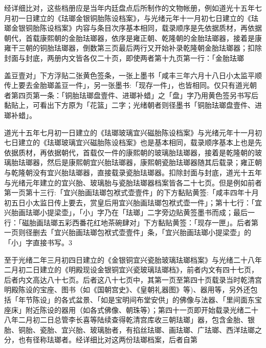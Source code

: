 经详细比对，这些档册应是当年内廷盘点后所制作的文物帐册，例如道光十五年七月初一日建立的《珐瑯金银铜胎陈设档案》，与光绪元年十一月初七日建立的《珐瑯金银铜胎陈设档案》内容与条目次序基本相同，载录顺序是先依据质材，再依据朝代，首载康熙朝的金胎珐瑯器，依序是雍正朝、乾隆朝的金胎珐瑯器，接着是康雍干三朝的铜胎珐瑯器，倒数第三页最后两行又开始补录乾隆朝金胎珐瑯器；扣除封面与封底，两册内文皆各仅二十页，即使两者第十九页第一行：「金胎珐瑯

\vfill
\begin{BookNotes}
\end{BookNotes}

\noindent 盖豆壹对」下方浮贴二张黄色签条，一张上墨书「咸丰三年六月十八日小太监平顺传上要去金胎瑯盖豆一件」，另一张墨书:「现存一件」，也皆相同。仅只有道光朝者第四页第一条：「铜胎珐瑯盘壹件、进瑯补蜡」之「盘」字乃用黄色签另书写后黏贴上，可看出下方原为「花篮」二字；光绪朝者则径墨书「铜胎珐瑯盘壹件、进瑯补蜡」。

道光十五年七月初一日建立的《珐瑯玻璃宜兴磁胎陈设档案》与光绪元年十一月初七日建立的《珐瑯玻璃宜兴磁胎陈设档案》也是基本相同，载录顺序基本上也是先依据质材，再依据朝代，首载仅一件的康熙朝的玻璃胎珐瑯器，接着是乾隆朝的玻璃胎珐瑯器，然后是康熙朝宜兴胎珐瑯器，康熙朝瓷胎珐瑯器随其后载录；雍正朝与乾隆朝没有宜兴胎珐瑯器，直接载录瓷胎珐瑯器。扣除封面与封底，道光十五年与光绪元年建立的宜兴胎、玻璃胎与瓷胎珐瑯器档案皆各二十七页。但是例如前者第一页第十三行:「宜兴胎画珐瑯包袱式壶壹件」的下方黏贴黄签:「咸丰四年十月初五日小太监日传上要去，赏皇后用宜兴胎画珐瑯包袱式壶一件」；第十七行：「宜兴胎画珐瑯小提梁壶」，「小」字乃在「珐瑯」二字旁边贴黄签墨书而成；最后一行：「磁胎画珐瑯五彩西番花红地茶碗肆对」下方黏贴黄签：「现存一匣」。后者第一页则径删去「宜兴胎画珐瑯包袱式壶壹件」条，「宜兴胎画珐瑯小提梁壶」的「小」字直接书写。3

至于光绪二年三月初四日建立的《金银铜宜兴瓷胎玻璃珐瑯档案》与光绪二十八年二月初二日建立的《明殿现设金银铜宜兴瓷玻璃珐瑯档》，前者内文有四十七页，后者内文高达八十七页。后者这八十七页中，其第一页至第四十页载录当时乾清宫明殿陈设的宝座、图书（如《国朝宫史》、《皇朝礼器图》等)、器用等，另外还包括「年节陈设」的各式盆景、「如是宝明间布堂安供」的佛像与法器、「里间面东宝座床」附近陈设的器用（如各式佛像、朝珠等）；第四十一页即开始载录光绪二十八年二月初二日总管李长喜等陆续查得乾清宫库收三朝珐瑯」器，包含金胎、银胎、铜胎、瓷胎、宜兴胎、玻璃胎者，有掐丝珐瑯、画珐瑯、广珐瑯、西洋珐瑯之分，也有径称珐瑯者。经详细比对这两份珐瑯档案，后者自第

